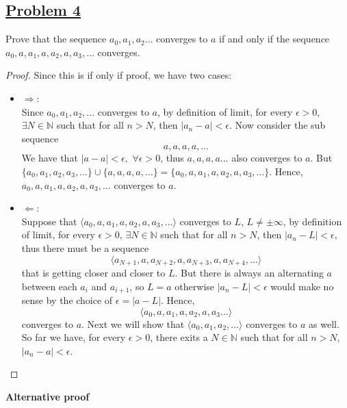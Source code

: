 \documentclass[10pt,letterpaper]{article}
\begin{document}
	\subsection*{{\color{purple}\underline{Problem 4}}}
	Prove that the sequence $a_0, a_1, a_2 \ldots$ converges to $a$ if and only if the 
	sequence $a_0, a, a_1, a, a_2, a, a_3, \ldots$ converges. 
	\begin{proof} Since this is if only if proof, we have two cases:
		\begin{itemize}
			\item $\Rightarrow$: \\
			Since $a_0, a_1, a_2, \ldots$ converges to $a$, by definition of limit,
			for every $\epsilon > 0$, $\exists N \in \mathbb{N}$ such that for all 
			$n > N$, then $|a_n - a| < \epsilon$. Now consider the sub sequence
			$$a, a, a, a, \ldots$$
			We have that $|a - a| < \epsilon, \, \, \forall \epsilon > 0$, thus
			$a, a, a, a \ldots$ also converges to $a$. But $\{a_0, a_1, a_2, a_3, \ldots\}
			\cup \{a, a, a, a, \ldots \} = \{a_0, a, a_1, a, a_2, a, a_3, \ldots\}$. Hence,
			$a_0, a, a_1, a, a_2, a, a_3, \ldots$ converges to $a$.
			
			\item $\Leftarrow$: \\
			Suppose that $\langle a_0, a, a_1, a, a_2, a, a_3, \ldots \rangle$ converges to $L$, 
			$L \neq \pm \infty$, by definition of limit, for every $\epsilon > 0$, $\exists N \in \mathbb{N}$ 
			such that for all $n > N$, then $|a_n - L| < \epsilon$, thus there must be a sequence
			$$\langle a_{N+1}, a, a_{N+2}, a, a_{N+3}, a, a_{N+4}, \ldots \rangle$$
			that is getting closer and closer to $L$. But there is always an alternating 
			$a$ between each $a_i$ and $a_{i+1}$, so $L = a$ otherwise $|a_n - L| < \epsilon$ would
			make no sense by the choice of $\epsilon = |a - L|$. Hence,
			$$\langle a_0, a, a_1, a, a_2, a, a_3 \ldots \rangle$$
			converges to $a$. Next we will show that $\langle a_0, a_1, a_2, \ldots \rangle$ converges
			to $a$ as well. So far we have, for every $\epsilon > 0$, there exits a $N \in \mathbb{N}$
			such that for all $n > N$, $|a_n - a| < \epsilon$.
		\end{itemize}
	\end{proof}
	\textbf{Alternative proof} 
\end{document}
